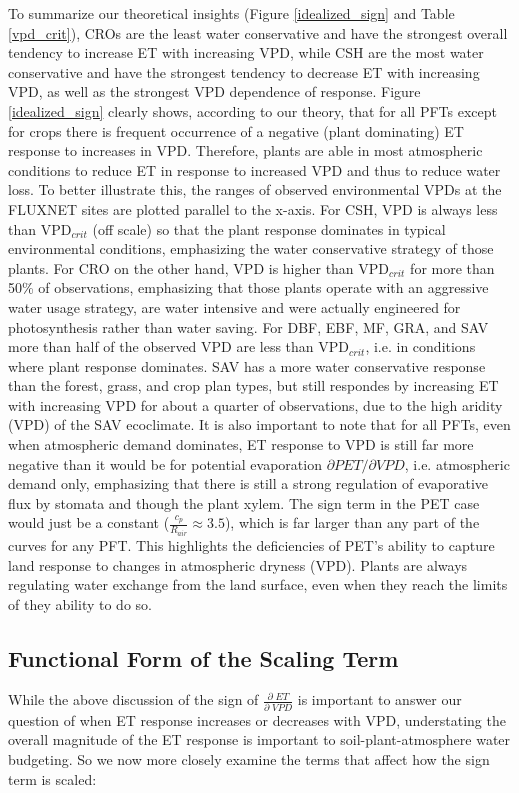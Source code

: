 \documentclass[draft,linenumbers]{agujournal}
\begin{document}
To summarize our theoretical insights (Figure \ref{idealized_sign} and
Table \ref{vpd_crit}), CROs are the least water conservative and have
the strongest overall tendency to increase ET with increasing VPD,
while CSH are the most water conservative and have the strongest
tendency to decrease ET with increasing VPD, as well as the strongest
VPD dependence of response. Figure \ref{idealized_sign} clearly shows,
according to our theory, that for all PFTs except for crops there is
frequent occurrence of a negative (plant dominating) ET response to
increases in VPD. Therefore, plants are able in most atmospheric
conditions to reduce ET in response to increased VPD and thus to
reduce water loss. To better illustrate this, the ranges of observed
environmental VPDs at the FLUXNET sites are plotted parallel to the
x-axis. For CSH, VPD is always less than VPD$_{crit}$ (off scale) so
that the plant response dominates in typical environmental conditions,
emphasizing the water conservative strategy of those plants. For CRO
on the other hand, VPD is higher than VPD$_{crit}$ for more than 50\%
of observations, emphasizing that those plants operate with an
aggressive water usage strategy, are water intensive and were actually
engineered for photosynthesis rather than water saving. For DBF, EBF,
MF, GRA, and SAV more than half of the observed VPD are less than
VPD$_{crit}$, i.e. in conditions where plant response dominates. SAV
has a more water conservative response than the forest, grass, and
crop plan types, but still respondes by increasing ET with increasing
VPD for about a quarter of observations, due to the high aridity (VPD)
of the SAV ecoclimate. It is also important to note that for all PFTs,
even when atmospheric demand dominates, ET response to VPD is still
far more negative than it would be for potential evaporation
$\partial PET/\partial VPD$, i.e. atmospheric demand only, emphasizing
that there is still a strong regulation of evaporative flux by stomata
and though the plant xylem. The sign term in the PET case would just
be a constant ($\frac{c_p}{R_{air}} \approx 3.5$), which is far larger
than any part of the curves for any PFT. This highlights the
deficiencies of PET's ability to capture land response to changes in
atmospheric dryness (VPD). Plants are always regulating water exchange
from the land surface, even when they reach the limits of they ability
to do so.

\subsection{Functional Form of the Scaling Term}
\label{scale_term}
While the above discussion of the sign of
$\frac{\partial \; ET}{\partial \; VPD}$ is important to answer our
question of when ET response increases or decreases with VPD,
understating the overall magnitude of the ET response is important to
soil-plant-atmosphere water budgeting. So we now more closely examine
the terms that affect how the sign term is scaled:
\end{document}
